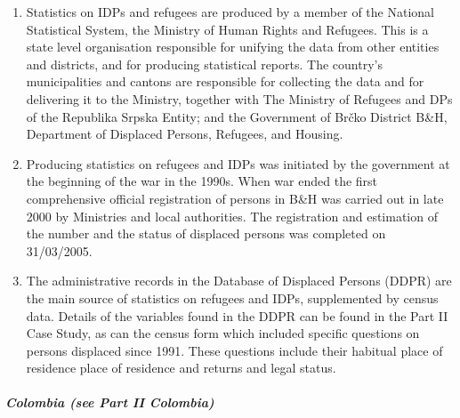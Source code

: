 \documentclass[
]{article}
\begin{document}
\begin{enumerate}
\def\labelenumi{\arabic{enumi}.}
\setcounter{enumi}{174}
\item
  Statistics on IDPs and refugees are produced by a member of the
  National Statistical System, the Ministry of Human Rights and
  Refugees. This is a state level organisation responsible for
  unifying the data from other entities and districts, and for
  producing statistical reports. The country's municipalities and
  cantons are responsible for collecting the data and for delivering
  it to the Ministry, together with The Ministry of Refugees and DPs
  of the Republika Srpska Entity; and the Government of Brčko District
  B\&H, Department of Displaced Persons, Refugees, and Housing.
\item
  Producing statistics on refugees and IDPs was initiated by the
  government at the beginning of the war in the 1990s. When war ended
  the first comprehensive official registration of persons in B\&H was
  carried out in late 2000 by Ministries and local authorities. The
  registration and estimation of the number and the status of
  displaced persons was completed on 31/03/2005.
\item
  The administrative records in the Database of Displaced Persons
  (DDPR) are the main source of statistics on refugees and IDPs,
  supplemented by census data. Details of the variables found in the
  DDPR can be found in the Part II Case Study, as can the census form
  which included specific questions on persons displaced since 1991.
  These questions include their habitual place of residence place of
  residence and returns and legal status.
\end{enumerate}

\hypertarget{colombia-see-part-ii-colombia}{%
\subparagraph{Colombia (see Part II Colombia)}\label{colombia-see-part-ii-colombia}}
\end{document}
